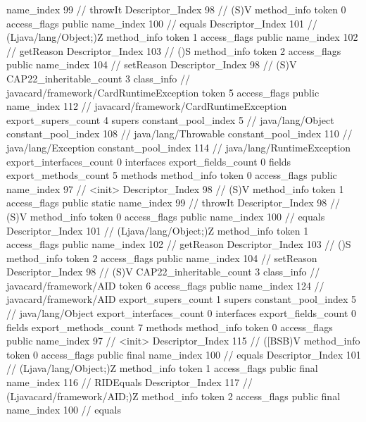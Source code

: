 {{{{{					name_index	99		// throwIt
					Descriptor_Index	98		// (S)V
				}
				method_info {
					token	0
					access_flags	public
					name_index	100		// equals
					Descriptor_Index	101		// (Ljava/lang/Object;)Z
				}
				method_info {
					token	1
					access_flags	public
					name_index	102		// getReason
					Descriptor_Index	103		// ()S
				}
				method_info {
					token	2
					access_flags	public
					name_index	104		// setReason
					Descriptor_Index	98		// (S)V
				}
			}
			CAP22_inheritable_count	3
		}
		class_info {		// javacard/framework/CardRuntimeException
			token	5
			access_flags	public
			name_index	112		// javacard/framework/CardRuntimeException
			export_supers_count	4
			supers {
				constant_pool_index	5		// java/lang/Object
				constant_pool_index	108		// java/lang/Throwable
				constant_pool_index	110		// java/lang/Exception
				constant_pool_index	114		// java/lang/RuntimeException
			}
			export_interfaces_count	0
			interfaces {
			}
			export_fields_count	0
			fields {
			}
			export_methods_count	5
			methods {
				method_info {
					token	0
					access_flags	public
					name_index	97		// <init>
					Descriptor_Index	98		// (S)V
				}
				method_info {
					token	1
					access_flags	public static
					name_index	99		// throwIt
					Descriptor_Index	98		// (S)V
				}
				method_info {
					token	0
					access_flags	public
					name_index	100		// equals
					Descriptor_Index	101		// (Ljava/lang/Object;)Z
				}
				method_info {
					token	1
					access_flags	public
					name_index	102		// getReason
					Descriptor_Index	103		// ()S
				}
				method_info {
					token	2
					access_flags	public
					name_index	104		// setReason
					Descriptor_Index	98		// (S)V
				}
			}
			CAP22_inheritable_count	3
		}
		class_info {		// javacard/framework/AID
			token	6
			access_flags	public
			name_index	124		// javacard/framework/AID
			export_supers_count	1
			supers {
				constant_pool_index	5		// java/lang/Object
			}
			export_interfaces_count	0
			interfaces {
			}
			export_fields_count	0
			fields {
			}
			export_methods_count	7
			methods {
				method_info {
					token	0
					access_flags	public
					name_index	97		// <init>
					Descriptor_Index	115		// ([BSB)V
				}
				method_info {
					token	0
					access_flags	public final
					name_index	100		// equals
					Descriptor_Index	101		// (Ljava/lang/Object;)Z
				}
				method_info {
					token	1
					access_flags	public final
					name_index	116		// RIDEquals
					Descriptor_Index	117		// (Ljavacard/framework/AID;)Z
				}
				method_info {
					token	2
					access_flags	public final
					name_index	100		// equals
}}}}}
